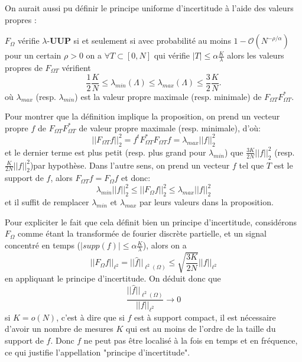 On aurait aussi pu définir le principe uniforme d'incertitude à l'aide des valeurs propres :
\begin{proposition}\label{th:lambdauup}
	$F_\Omega$ vérifie $\lambda$-\textbf{UUP} si et seulement si 
	\newline
	avec probabilité au moins $1-\mathcal{O}(N^{-\rho / \alpha})$ pour un certain $\rho>0$ on a
	$\forall T \subset [0, N]$ qui vérifie $|T| \leq \alpha \frac{K}{\lambda}$ alors les valeurs propres de $F_{\Omega T}$ vérifient
	\begin{equation*}
		\frac{1}{2} \frac{K}{N} \leq \lambda_{min}(\Lambda) \leq \lambda_{max}(\Lambda) \leq \frac{3}{2}\frac{K}{N}.
	\end{equation*}
	où $\lambda_{max}$ (resp. $\lambda_{min}$) est la valeur propre maximale (resp. minimale) de $F_{\Omega T} F_{\Omega T}^*$. 
\end{proposition}
\begin{preuve}
	Pour montrer que la définition implique la proposition, on prend un vecteur propre $f$ de $F_{\Omega T}F_{\Omega T}^*$ de valeur propre maximale (resp. minimale), d'où:
	\begin{equation}
		||F_{\Omega T} f||_2^2 = f^t F_{\Omega T}^*F_{\Omega T} f = \lambda_{max} ||f||_2^2 
	\end{equation}
	et le dernier terme est plus petit (resp. plus grand pour $\lambda_{min}$) que $\frac{3K}{2N}||f||_2^2$  (resp. $\frac{K}{2N}||f||_2^2$)par hypothèse.
	\newline
	Dans l'autre sens, on prend un vecteur $f$ tel que $T$ est le support de $f$, alors $F_{\Omega T} f = F_\Omega f$ et donc:
	\begin{equation}
		\lambda_{min} ||f||_2^2 \leq ||F_\Omega f||_2^2 \leq \lambda_{max} ||f||_2^2
	\end{equation}
	et il suffit de remplacer $\lambda_{min}$ et $\lambda_{max}$ par leurs valeurs dans la proposition.
\end{preuve}
\begin{remarque}
	Pour expliciter le fait que cela définit bien un principe d'incertitude, considérons $F_\Omega$ comme étant la transformée de fourier discrète partielle, et un signal concentré en temps ($|supp(f)| \leq \alpha \frac{K}{\lambda}$), alors on a 
	\begin{equation}
		||F_\Omega f||_{\ell^2} = ||\hat{f}||_{\ell^2(\Omega)} \leq \sqrt{\frac{3 K}{2N}}||f||_{\ell^2}
	\end{equation}
	en appliquant le principe d'incertitude.
	On déduit donc que 
	\begin{equation}
		\frac{ ||\hat{f}||_{\ell^2(\Omega)}}{||f||_{\ell^2}} \longrightarrow 0
	\end{equation}
	si $K=o(N)$, c'est à dire que si $f$ est à support compact, il est nécessaire d'avoir un nombre de mesures $K$ qui est au moins de l'ordre de la taille du support de $f$.
	Donc $f$ ne peut pas être localisé à la fois en temps et en fréquence, ce qui justifie l'appellation "principe d'incertitude". 
\end{remarque}

